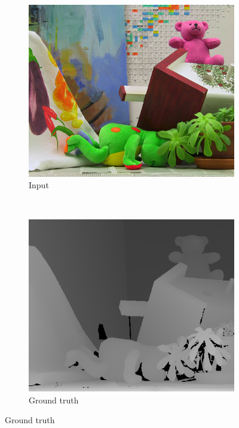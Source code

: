 \begin{figure}
  \setcounter{subfigure}{0}

  \label{fig:grid-of-outputs-teddy}
  \centering

  \begin{subfigure}[b]{0.45\textwidth}
    \centering
    \includegraphics[width=\textwidth]{images/stereo-pairs/teddy_imL.png}
    \caption{Input}
  \end{subfigure}
  ~
  \begin{subfigure}[b]{0.45\textwidth}
    \centering
    \includegraphics[width=\textwidth]{images/stereo-pairs/teddy_groundtruth.png}
    \caption{Ground truth}
  \end{subfigure}


\end{figure}
